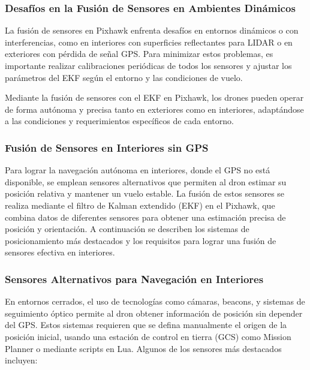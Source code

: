     \subsubsection{Desafíos en la Fusión de Sensores en Ambientes Dinámicos}
    La fusión de sensores en Pixhawk enfrenta desafíos en entornos dinámicos o con interferencias, como en interiores con superficies reflectantes para LIDAR o en exteriores con pérdida de señal GPS. Para minimizar estos problemas, es importante realizar calibraciones periódicas de todos los sensores y ajustar los parámetros del EKF según el entorno y las condiciones de vuelo.
    
    Mediante la fusión de sensores con el EKF en Pixhawk, los drones pueden operar de forma autónoma y precisa tanto en exteriores como en interiores, adaptándose a las condiciones y requerimientos específicos de cada entorno.
    

    \subsubsection{Fusión de Sensores en Interiores sin GPS}
    Para lograr la navegación autónoma en interiores, donde el GPS no está disponible, se emplean sensores alternativos que permiten al dron estimar su posición relativa y mantener un vuelo estable. La fusión de estos sensores se realiza mediante el filtro de Kalman extendido (EKF) en el Pixhawk, que combina datos de diferentes sensores para obtener una estimación precisa de posición y orientación. A continuación se describen los sistemas de posicionamiento más destacados y los requisitos para lograr una fusión de sensores efectiva en interiores.
    
    \subsubsection{Sensores Alternativos para Navegación en Interiores}
    En entornos cerrados, el uso de tecnologías como cámaras, beacons, y sistemas de seguimiento óptico permite al dron obtener información de posición sin depender del GPS. Estos sistemas requieren que se defina manualmente el origen de la posición inicial, usando una estación de control en tierra (GCS) como Mission Planner o mediante scripts en Lua. Algunos de los sensores más destacados incluyen:
    
